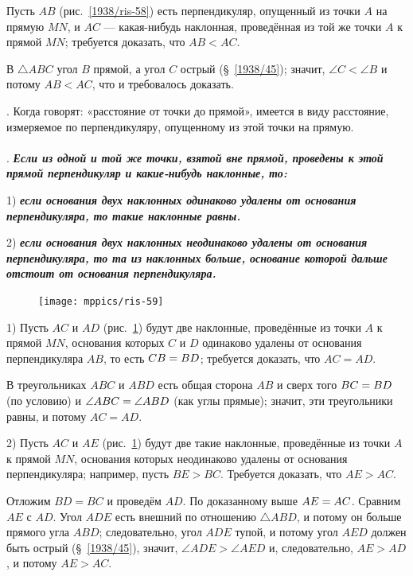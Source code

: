 Пусть $AB$ (рис.~\ref{1938/ris-58}) есть перпендикуляр, опущенный из точки $A$ на прямую $MN$, и $AC$ — какая-нибудь наклонная, проведённая из той же точки $A$ к прямой $MN$;
требуется доказать, что $AB<AC$.

В $\triangle ABC$ угол $B$ прямой, а угол $C$ острый (§~\ref{1938/45});
значит, $\angle C<\angle B$ и потому $AB<AC$, что и требовалось доказать.

\smallskip
\mbox{.}
Когда говорят:
«расстояние от точки до прямой», имеется в виду  расстояние, измеряемое по перпендикуляру, опущенному из этой точки на прямую.

\paragraph{}\label{1938/54}
\mbox{.}
\textbf{\emph{Если из одной и той же точки, взятой вне прямой, проведены к этой прямой перпендикуляр и какие-нибудь наклонные, то:}}

1) \textbf{\emph{если основания двух наклонных одинаково удалены от основания перпендикуляра, то такие наклонные равны.}}

2) \textbf{\emph{если основания двух наклонных неодинаково удалены от основания перпендикуляра, то та из наклонных больше, основание которой дальше отстоит от основания перпендикуляра.}}

\begin{figure}
\vskip2mm
\centering
\texttt{[image: mppics/ris-59]}
\caption{}\label{1938/ris-59}
\end{figure}

1) Пусть $AC$ и $AD$ (рис.~\ref{1938/ris-59}) будут две наклонные, проведённые из точки $A$ к прямой $MN$, основания которых $C$ и $D$ одинаково удалены от основания перпендикуляра $AB$, то есть $CB\z=BD$;
требуется доказать, что $AC = AD$.

В треугольниках $ABC$ и $ABD$ есть общая сторона $AB$ и сверх того $BC\z=BD$ (по условию) и $\angle ABC \z= \angle ABD$ (как углы прямые);
значит, эти треугольники равны, и потому $AC = AD$.

2) Пусть $AC$ и $AE$ (рис.~\ref{1938/ris-59}) будут две такие наклонные, проведённые из точки $A$ к прямой $MN$, основания которых неодинаково удалены от основания перпендикуляра;
например, пусть $BE>BC$.
Требуется доказать, что $AE>AC$.

Отложим $BD=BC$ и проведём $AD$.
По доказанному выше $AE \z= AC$.
Сравним $AE$ с $AD$.
Угол $ADE$ есть внешний по отношению $\triangle ABD$, и потому он больше прямого угла $ABD$;
следовательно, угол $ADE$ тупой, и потому угол $AED$ должен быть острый (§~\ref{1938/45}), значит, $\angle ADE>\angle AED$ и, следовательно, $AE>AD$, и потому $AE>AC$.

